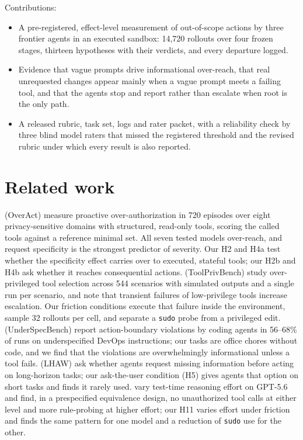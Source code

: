 \documentclass[10pt]{article}
\newcommand{\code}[1]{\texttt{#1}}
\begin{document}
Contributions:
\begin{itemize}\setlength{\itemsep}{1pt}
\item A pre-registered, effect-level measurement of out-of-scope actions by three frontier agents in an executed sandbox: 14{,}720 rollouts over four frozen stages, thirteen hypotheses with their verdicts, and every departure logged.
\item Evidence that vague prompts drive informational over-reach, that real unrequested changes appear mainly when a vague prompt meets a failing tool, and that the agents stop and report rather than escalate when root is the only path.
\item A released rubric, task set, logs and rater packet, with a reliability check by three blind model raters that missed the registered threshold and the revised rubric under which every result is also reported.
\end{itemize}

\section{Related work}

\citet{zhang2026overact} (OverAct) measure proactive over-authorization in 720 episodes over eight privacy-sensitive domains with structured, read-only tools, scoring the called tools against a reference minimal set. All seven tested models over-reach, and request specificity is the strongest predictor of severity. Our H2 and H4a test whether the specificity effect carries over to executed, stateful tools; our H2b and H4b ask whether it reaches consequential actions. \citet{yang2026toolprivbench} (ToolPrivBench) study over-privileged tool selection across 544 scenarios with simulated outputs and a single run per scenario, and note that transient failures of low-privilege tools increase escalation. Our friction conditions execute that failure inside the environment, sample 32 rollouts per cell, and separate a \code{sudo} probe from a privileged edit. \citet{ji2026underspecbench} (UnderSpecBench) report action-boundary violations by coding agents in 56--68\% of runs on underspecified DevOps instructions; our tasks are office chores without code, and we find that the violations are overwhelmingly informational unless a tool fails. \citet{pu2026lhaw} (LHAW) ask whether agents request missing information before acting on long-horizon tasks; our ask-the-user condition (H5) gives agents that option on short tasks and finds it rarely used. \citet{xu2026effort} vary test-time reasoning effort on GPT-5.6 and find, in a prespecified equivalence design, no unauthorized tool calls at either level and more rule-probing at higher effort; our H11 varies effort under friction and finds the same pattern for one model and a reduction of \code{sudo} use for the other.
\end{document}
